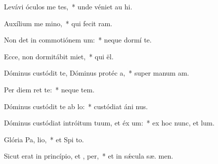\item Levávi óculos me  tes,~* unde véniet au hi.
\item Auxílium me  mino,~* qui fecit   ram.
\item Non det in commotiónem  um:~* neque dormí   te.
\item Ecce, non dormitábit  miet,~* qui  ël.
\item Dóminus custódit te, Dóminus protéc a,~* super manum  am.
\item Per diem   ret te:~* neque   tem.
\item Dóminus custódit te ab  lo:~* custódiat áni  nus.
\item Dóminus custódiat intróitum tuum, et éx um:~* ex hoc nunc, et   lum.
\item Glória Pa,  lio,~* et Spi to.
\item Sicut erat in princípio, et ,  per,~* et in sǽcula sæ. men.
